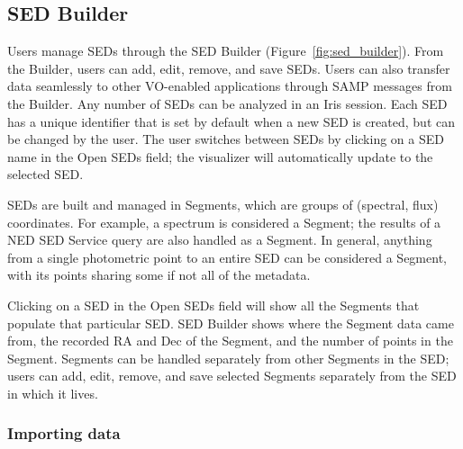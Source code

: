 \documentclass[final,5p]{elsarticle}
\begin{document}
\subsection{SED Builder}

Users manage SEDs through the SED Builder (Figure~\ref{fig:sed_builder}). From the Builder, users can add, edit, remove, and save SEDs. Users can also transfer data seamlessly to other VO-enabled applications through SAMP messages from the Builder. Any number of SEDs can be analyzed in an Iris session. Each SED has a unique identifier that is set by default when a new SED is created, but can be changed by the user. The user switches between SEDs by clicking on a SED name in the Open SEDs field; the visualizer will automatically update to the selected SED.

SEDs are built and managed in Segments, which are groups of (spectral, flux) coordinates. For example, a spectrum is considered a Segment; the results of a NED SED Service query are also handled as a Segment. In general, anything from a single photometric point to an entire SED can be considered a Segment, with its points sharing some if not all of the metadata.

Clicking on a SED in the Open SEDs field will show all the Segments that populate that particular SED. SED Builder shows where the Segment data came from, the recorded RA and Dec of the Segment, and the number of points in the Segment. Segments can be handled separately from other Segments in the SED; users can add, edit, remove, and save selected Segments separately from the SED in which it lives.

\subsubsection{Importing data}
\end{document}
